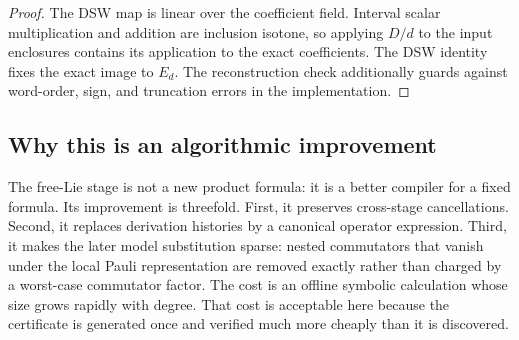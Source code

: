 \begin{proof}
The DSW map is linear over the coefficient field.  Interval scalar
multiplication and addition are inclusion isotone, so applying $D/d$ to the
input enclosures contains its application to the exact coefficients.  The DSW
identity fixes the exact image to $E_d$.  The reconstruction check additionally
guards against word-order, sign, and truncation errors in the implementation.
\end{proof}

\subsection{Why this is an algorithmic improvement}

The free-Lie stage is not a new product formula: it is a better compiler for a
fixed formula.  Its improvement is threefold.  First, it preserves
cross-stage cancellations.  Second, it replaces derivation histories by a
canonical operator expression.  Third, it makes the later model substitution
sparse: nested commutators that vanish under the local Pauli representation
are removed exactly rather than charged by a worst-case commutator factor.
The cost is an offline symbolic calculation whose size grows rapidly with
degree.  That cost is acceptable here because the certificate is generated
once and verified much more cheaply than it is discovered.

